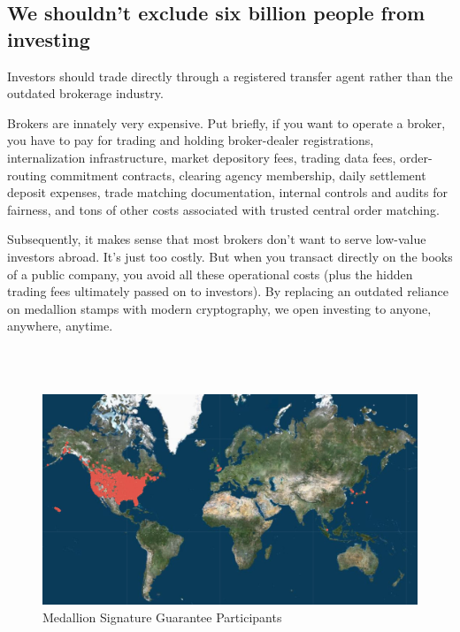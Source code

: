 \documentclass[11pt, english]{article}
\begin{document}
\begin{multicols}{2}
\subsection{We shouldn't exclude six billion people from investing}

Investors should trade directly through a registered transfer agent rather than the outdated brokerage industry. 

Brokers are innately very expensive. Put briefly, if you want to operate a broker, you have to pay for trading and holding broker-dealer registrations, internalization infrastructure, market depository fees, trading data fees, order-routing commitment contracts, clearing agency membership, daily settlement deposit expenses, trade matching documentation, internal controls and audits for fairness, and tons of other costs associated with trusted central order matching.

Subsequently, it makes sense that most brokers don't want to serve low-value investors abroad. It's just too costly. But when you transact directly on the books of a public company, you avoid all these operational costs (plus the hidden trading fees ultimately passed on to investors). By replacing an outdated reliance on medallion stamps with modern cryptography, we open investing to anyone, anywhere, anytime.

\end{multicols}

\\\\
\begin{figure}[H]
    \centering
    \includegraphics[width=420pt]{imgs/msg-map.jpg}
    \caption{Medallion Signature Guarantee Participants \cite{MSGP}}
\end{figure}

\pagebreak
\begin{multicols}{2}
\footnotesize{
    
    
}

\end{multicols}
\end{document}
